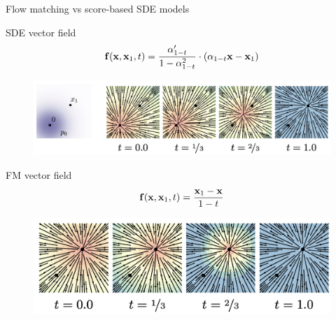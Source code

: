 \begin{frame}{Flow matching vs score-based SDE models}
	\begin{block}{SDE vector field}
		\vspace{-0.3cm}
		\[
			\mathbf{f}(\mathbf{x}, \mathbf{x}_1, t) = \frac{\alpha'_{1-t}}{1 - \alpha^2_{1-t}}\cdot \left(\alpha_{1-t}  \mathbf{x} - \mathbf{x}_1\right)
		\]
		\vspace{-0.5cm}
		\begin{figure}
			\raggedleft
			\includegraphics[width=0.8\linewidth]{figs/diff_cond_path}
		\end{figure}
		\vspace{-0.5cm}
	\end{block}
	\begin{block}{FM vector field}
		\vspace{-0.3cm}
		\[
			\mathbf{f}(\mathbf{x}, \mathbf{x}_1, t) = \frac{\mathbf{x}_1  - \mathbf{x}}{1-t}
		\]
		\vspace{-0.5cm}
		\begin{figure}
			\raggedleft
			\includegraphics[width=0.6\linewidth]{figs/ot_cond_path}
		\end{figure}
	\end{block}
\end{frame}
